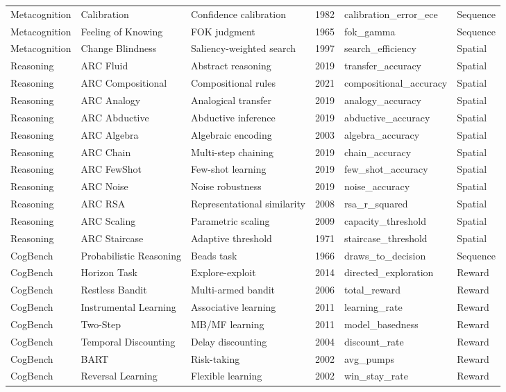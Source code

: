 \documentclass[10pt,landscape]{article}
\begin{document}
\begin{longtable}{@{}p{2.3cm}p{3.0cm}p{4.5cm}p{0.6cm}p{3.8cm}p{1.8cm}@{}}
\midrule
Metacognition & Calibration & Confidence calibration & 1982 & calibration\_error\_ece & Sequence \\
Metacognition & Feeling of Knowing & FOK judgment & 1965 & fok\_gamma & Sequence \\
Metacognition & Change Blindness & Saliency-weighted search \citep{rensink1997see} & 1997 & search\_efficiency & Spatial \\

\midrule
Reasoning & ARC Fluid & Abstract reasoning \citep{chollet2019measure} & 2019 & transfer\_accuracy & Spatial \\
Reasoning & ARC Compositional & Compositional rules & 2021 & compositional\_accuracy & Spatial \\
Reasoning & ARC Analogy & Analogical transfer & 2019 & analogy\_accuracy & Spatial \\
Reasoning & ARC Abductive & Abductive inference & 2019 & abductive\_accuracy & Spatial \\
Reasoning & ARC Algebra & Algebraic encoding & 2003 & algebra\_accuracy & Spatial \\
Reasoning & ARC Chain & Multi-step chaining & 2019 & chain\_accuracy & Spatial \\
Reasoning & ARC FewShot & Few-shot learning & 2019 & few\_shot\_accuracy & Spatial \\
Reasoning & ARC Noise & Noise robustness & 2019 & noise\_accuracy & Spatial \\
Reasoning & ARC RSA & Representational similarity & 2008 & rsa\_r\_squared & Spatial \\
Reasoning & ARC Scaling & Parametric scaling & 2009 & capacity\_threshold & Spatial \\
Reasoning & ARC Staircase & Adaptive threshold & 1971 & staircase\_threshold & Spatial \\

\midrule
CogBench & Probabilistic Reasoning & Beads task & 1966 & draws\_to\_decision & Sequence \\
CogBench & Horizon Task & Explore-exploit & 2014 & directed\_exploration & Reward \\
CogBench & Restless Bandit & Multi-armed bandit & 2006 & total\_reward & Reward \\
CogBench & Instrumental Learning & Associative learning & 2011 & learning\_rate & Reward \\
CogBench & Two-Step & MB/MF learning \citep{daw2011model} & 2011 & model\_basedness & Reward \\
CogBench & Temporal Discounting & Delay discounting & 2004 & discount\_rate & Reward \\
CogBench & BART & Risk-taking \citep{lejuez2002evaluation} & 2002 & avg\_pumps & Reward \\
CogBench & Reversal Learning & Flexible learning \citep{cools2002reversal} & 2002 & win\_stay\_rate & Reward \\


\end{longtable}
\end{document}
